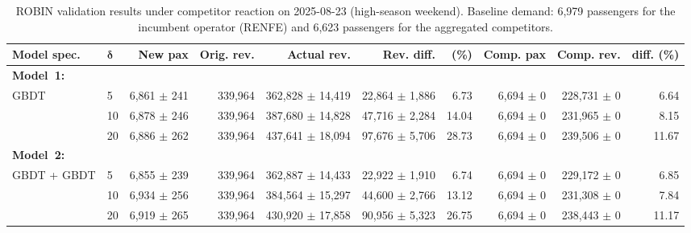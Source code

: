 \begin{table}[!h]
    \centering
    \caption{ROBIN validation results under competitor reaction on 2025-08-23 (high-season weekend). Baseline demand: 6,979 passengers for the incumbent operator (RENFE) and 6,623 passengers for the aggregated competitors.}
    \label{tab:model2_validation_2025_08_23}
    \scriptsize
    \setlength{\tabcolsep}{3pt}
    \begin{tabular}{llrrrrrrrr}
        \toprule
        \textbf{Model spec.}
        & \(\boldsymbol{\delta}\)
        & \textbf{New pax}
        & \textbf{Orig. rev.}
        & \textbf{Actual rev.}
        & \textbf{Rev. diff.}
        & \textbf{(\%)}
        & \textbf{Comp. pax}
        & \textbf{Comp. rev.}
        & \textbf{diff. (\%)} \\
        \midrule
        \multicolumn{10}{l}{\textbf{Model~1:}} \\[1ex]
        \multirow{3}{*}{GBDT} & 5 & 6,861 $\pm$ 241 & 339,964 & 362,828 $\pm$ 14,419 & 22,864 $\pm$ 1,886 & 6.73 & 6,694 $\pm$ 0 & 228,731 $\pm$ 0 & 6.64 \\
         & 10 & 6,878 $\pm$ 246 & 339,964 & 387,680 $\pm$ 14,828 & 47,716 $\pm$ 2,284 & 14.04 & 6,694 $\pm$ 0 & 231,965 $\pm$ 0 & 8.15 \\
         & 20 & 6,886 $\pm$ 262 & 339,964 & 437,641 $\pm$ 18,094 & 97,676 $\pm$ 5,706 & 28.73 & 6,694 $\pm$ 0 & 239,506 $\pm$ 0 & 11.67 \\
        \midrule
        \multicolumn{10}{l}{\textbf{Model~2:}} \\
        \multirow{3}{*}{GBDT + GBDT} & 5 & 6,855 $\pm$ 239 & 339,964 & 362,887 $\pm$ 14,433 & 22,922 $\pm$ 1,910 & 6.74 & 6,694 $\pm$ 0 & 229,172 $\pm$ 0 & 6.85 \\
         & 10 & 6,934 $\pm$ 256 & 339,964 & 384,564 $\pm$ 15,297 & 44,600 $\pm$ 2,766 & 13.12 & 6,694 $\pm$ 0 & 231,308 $\pm$ 0 & 7.84 \\
         & 20 & 6,919 $\pm$ 265 & 339,964 & 430,920 $\pm$ 17,858 & 90,956 $\pm$ 5,323 & 26.75 & 6,694 $\pm$ 0 & 238,443 $\pm$ 0 & 11.17 \\
        \bottomrule
    \end{tabular}
\end{table}